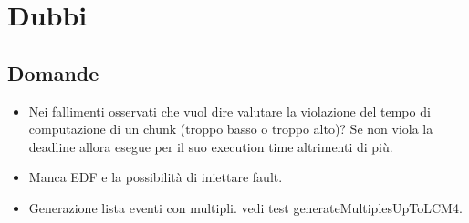 \chapter{Dubbi}

\section{Domande}
\begin{itemize}
    \item  Nei fallimenti osservati che vuol dire valutare la violazione del tempo di computazione di un chunk (troppo basso o troppo alto)? Se non viola la deadline allora esegue per il suo execution time altrimenti di più.
    \item Manca EDF e la possibilità di iniettare fault.

    \item Generazione lista eventi con multipli. vedi test generateMultiplesUpToLCM4.
\end{itemize}